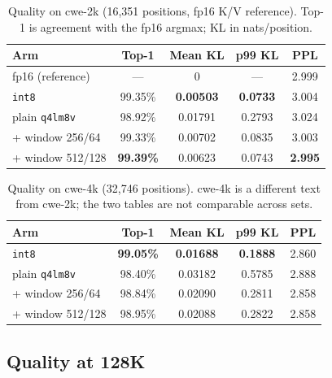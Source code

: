 \documentclass[10pt,twocolumn]{article}
\begin{document}
\begin{table}[t]
\centering
\small
\begin{tabular}{@{}lcccc@{}}
\toprule
\textbf{Arm} & \textbf{Top-1} & \textbf{Mean KL} & \textbf{p99 KL} & \textbf{PPL} \\
\midrule
fp16 (reference) & --- & 0 & --- & 2.999 \\
\texttt{int8} & 99.35\% & \textbf{0.00503} & \textbf{0.0733} & 3.004 \\
plain \texttt{q4lm8v} & 98.92\% & 0.01791 & 0.2793 & 3.024 \\
+ window 256/64 & 99.33\% & 0.00702 & 0.0835 & 3.003 \\
+ window 512/128 & \textbf{99.39\%} & 0.00623 & 0.0743 & \textbf{2.995} \\
\bottomrule
\end{tabular}
\caption{Quality on cwe-2k (16,351 positions, fp16 K/V reference). Top-1 is agreement with the fp16 argmax; KL in nats/position.}
\label{tab:q2k}
\end{table}

\begin{table}[t]
\centering
\small
\begin{tabular}{@{}lcccc@{}}
\toprule
\textbf{Arm} & \textbf{Top-1} & \textbf{Mean KL} & \textbf{p99 KL} & \textbf{PPL} \\
\midrule
\texttt{int8} & \textbf{99.05\%} & \textbf{0.01688} & \textbf{0.1888} & 2.860 \\
plain \texttt{q4lm8v} & 98.40\% & 0.03182 & 0.5785 & 2.888 \\
+ window 256/64 & 98.84\% & 0.02090 & 0.2811 & 2.858 \\
+ window 512/128 & 98.95\% & 0.02088 & 0.2822 & 2.858 \\
\bottomrule
\end{tabular}
\caption{Quality on cwe-4k (32,746 positions). cwe-4k is a different text from cwe-2k; the two tables are not comparable across sets.}
\label{tab:q4k}
\end{table}

\subsection{Quality at 128K}
\end{document}
